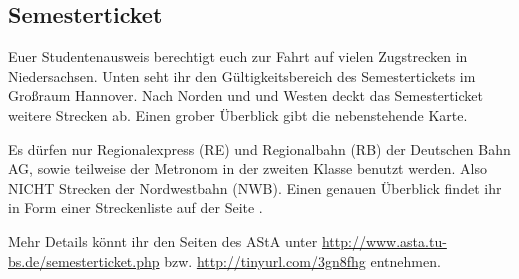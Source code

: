 \begin{multicols}{2}
\subsection{Semesterticket}
	Euer Studentenausweis berechtigt euch zur Fahrt auf vielen Zugstrecken in Niedersachsen. Unten seht ihr den Gültigkeitsbereich des Semestertickets im Großraum Hannover. Nach Norden und und Westen deckt das Semesterticket weitere Strecken ab. Einen grober Überblick gibt die nebenstehende Karte. 

	Es dürfen nur Regionalexpress (RE) und Regionalbahn (RB) der Deutschen Bahn AG, sowie teilweise der Metronom in der zweiten Klasse benutzt werden. Also NICHT Strecken der Nordwestbahn (NWB). Einen genauen Überblick findet ihr in Form einer Streckenliste auf der Seite \pageref{streckenliste1}.

	Mehr Details könnt ihr den Seiten des AStA unter \url{http://www.asta.tu-bs.de/semesterticket.php} bzw. \url{http://tinyurl.com/3gn8fhg} entnehmen.
\end{multicols}
\newpage
\newpage
\newpage

